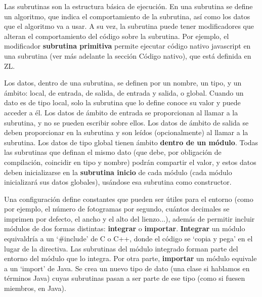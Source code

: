 \documentclass{report}
\begin{document}
	\vspace{10px}
	
	Las subrutinas son la estructura básica de ejecución. En una subrutina se define un algoritmo, que indica el comportamiento de la subrutina, así como los datos que el algoritmo va a usar. A su vez, la subrutina puede tener modificadores que alteran el comportamiento del código sobre la subrutina. Por ejemplo, el modificador \textbf{subrutina primitiva} permite ejecutar código nativo javascript en una subrutina (ver más adelante la sección Código nativo), que está definida en ZL.
	
	\vspace{10px}
	
	Los datos, dentro de una subrutina, se definen por un nombre, un tipo, y un ámbito: local, de entrada, de salida, de entrada y salida, o global. Cuando un dato es de tipo local, solo la subrutina que lo define conoce su valor y puede acceder a él. Los datos de ámbito de entrada se proporcionan al llamar a la subrutina, y no se pueden escribir sobre ellos. Los datos de ámbito de salida se deben proporcionar en la subrutina y son leídos (opcionalmente) al llamar a la subrutina. Los datos de tipo global tienen ámbito \textbf{dentro de un módulo}. Todas las subrutinas que definan el mismo dato (que debe, por obligación de compilación, coincidir en tipo y nombre) podrán compartir el valor, y estos datos deben inicializarse en la \textbf{subrutina inicio} de cada módulo (cada módulo inicializará sus datos globales), usándose esa subrutina como constructor. 
	
	\vspace{10px}
	
	Una configuración define constantes que pueden ser útiles para el entorno (como por ejemplo, el número de fotogramas por segundo, cuántos decimales se imprimen por defecto, el ancho y el alto del lienzo...), además de permitir incluir módulos de dos formas distintas: \textbf{integrar} o \textbf{importar}. \textbf{Integrar} un módulo equivaldría a un `\#include' de C o C++, donde el código se `copia y pega' en el lugar de la directiva. Las subrutinas del módulo integrado forman parte del entorno del módulo que lo integra. Por otra parte, \textbf{importar} un módulo equivale a un `import' de Java. Se crea un nuevo tipo de dato (una clase si hablamos en términos Java) cuyas subrutinas pasan a ser parte de ese tipo (como si fuesen miembros, en Java).
	
	\vspace{10px}
	
\end{document}
